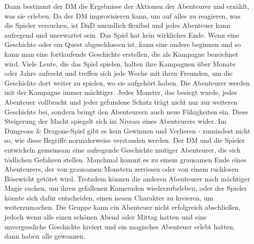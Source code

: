 Dann bestimmt der DM die Ergebnisse der Aktionen der Abenteurer und erzählt, was sie erleben. Da der DM improvisieren kann, um auf alles zu reagieren, was die Spieler versuchen, ist DnD unendlich flexibel und jedes Abenteuer kann aufregend und unerwartet sein. Das Spiel hat kein wirkliches Ende. Wenn eine Geschichte oder ein Quest abgeschlossen ist, kann eine andere beginnen und so kann man eine fortlaufende Geschichte erstellen, die als Kampagne bezeichnet wird. Viele Leute, die das Spiel spielen, halten ihre Kampagnen über Monate oder Jahre aufrecht und treffen sich jede Woche mit ihren Freunden, um die Geschichte dort weiter zu spielen, wo sie aufgehört haben. Die Abenteurer werden mit der Kampagne immer mächtiger. Jedes Monster, das besiegt wurde, jedes Abenteuer vollbracht und jeder gefundene Schatz trägt nicht nur zur weiteren Geschichte bei, sondern bringt den Abenteurern auch neue Fähigkeiten ein. Diese Steigerung der Macht spiegelt sich im Niveau eines Abenteurers wider. Im Dungeons & Dragons-Spiel gibt es kein Gewinnen und Verlieren - zumindest nicht so, wie diese Begriffe normalerweise verstanden werden. Der DM und die Spieler entwickeln gemeinsam eine aufregende Geschichte mutiger Abenteurer, die sich tödlichen Gefahren stellen. Manchmal kommt es zu einem grausamen Ende eines Abenteurers, der von grausamen Monstern zerrissen oder von einem ruchlosen Bösewicht getötet wird. Trotzdem können die anderen Abenteurer nach mächtiger Magie suchen, um ihren gefallenen Kameraden wiederzubeleben, oder der Spieler könnte sich dafür entscheiden, einen neuen Charakter zu kreieren, um weiterzumachen. Die Gruppe kann ein Abenteuer nicht erfolgreich abschließen, jedoch wenn alle einen schönen Abend oder Mittag hatten und eine unvergessliche Geschichte kreiert und ein magisches Abenteuer erlebt hatten, dann haben alle gewonnen.

